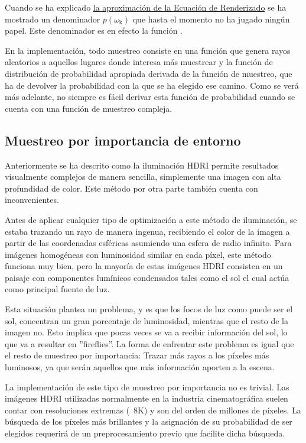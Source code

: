 Cuando se ha explicado \hyperref[subsec:montecarlo]{la aproximación de la Ecuación de Renderizado} se ha mostrado un denominador $p(\omega _{\text{k}})$ que hasta el momento no ha jugado ningún papel. Este denominador es en efecto la función .

En la implementación, todo muestreo consiste en una función que genera rayos aleatorios a aquellos lugares donde interesa más muestrear  y la función de distribución de probabilidad apropiada  derivada de la función de muestreo, que ha de devolver la probabilidad con la que se ha elegido ese camino. Como se verá más adelante, no siempre es fácil derivar esta función de probabilidad cuando se cuenta con una función de muestreo compleja.


\subsection{Muestreo por importancia de entorno}
	
Anteriormente se ha descrito como la iluminación HDRI permite resultados visualmente complejos de manera sencilla, simplemente una imagen con alta profundidad de color. Este método por otra parte también cuenta con inconvenientes. 

Antes de aplicar cualquier tipo de optimización a este método de iluminación, se estaba trazando un rayo de manera ingenua, recibiendo el color de la imagen a partir de las coordenadas esféricas asumiendo una esfera de radio infinito. Para imágenes homogéneas con luminosidad similar en cada píxel, este método funciona muy bien, pero la mayoría de estas imágenes HDRI consisten en un paisaje con componentes lumínicos condensados tales como el sol el cual actúa como principal fuente de luz.

Esta situación plantea un problema, y es que los focos de luz como puede ser el sol, concentran un gran porcentaje de luminosidad, mientras que el resto de la imagen no. Esto implica que pocas veces se va a recibir información del sol, lo que va a resultar en ''fireflies''. La forma de enfrentar este problema es igual que el resto de muestreo por importancia: Trazar más rayos a los píxeles más luminosos, ya que serán aquellos que más información aporten a la escena.

La implementación de este tipo de muestreo por importancia no es trivial. Las imágenes HDRI utilizadas normalmente en la industria cinematográfica suelen contar con resoluciones extremas (~8K) y son del orden de millones de píxeles. La búsqueda de los píxeles más brillantes y la asignación de su probabilidad de ser elegidos requerirá de un preprocesamiento previo que facilite dicha búsqueda.

